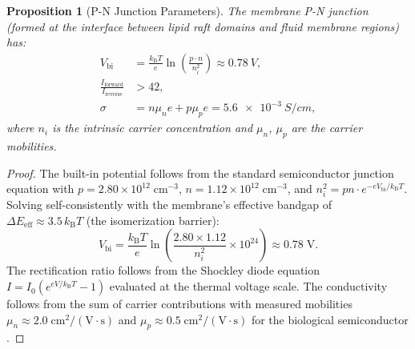 \documentclass[12pt]{article}
\newtheorem{proposition}[theorem]{Proposition}
\theoremstyle{definition}
\theoremstyle{remark}
\newcommand{\kB}{k_{\mathrm{B}}}
\begin{document}
\begin{proposition}[P-N Junction Parameters]
\label{prop:pn_junction}
The membrane P-N junction (formed at the interface between lipid raft domains and fluid membrane regions) has:
\begin{align}
  V_{\mathrm{bi}} &= \frac{\kB T}{e} \ln\!\left(\frac{p \cdot n}{n_i^2}\right) \approx \SI{0.78}{V}, \label{eq:built_in} \\
  \frac{I_{\mathrm{forward}}}{I_{\mathrm{reverse}}} &> 42, \label{eq:rectification} \\
  \sigma &= n\mu_n e + p\mu_p e = \SI{5.6e-3}{S/cm}, \label{eq:conductivity}
\end{align}
where $n_i$ is the intrinsic carrier concentration and $\mu_n$, $\mu_p$ are the carrier mobilities.
\end{proposition}

\begin{proof}
The built-in potential follows from the standard semiconductor junction equation with $p = 2.80 \times 10^{12}\;\mathrm{cm}^{-3}$, $n = 1.12 \times 10^{12}\;\mathrm{cm}^{-3}$, and $n_i^2 = pn \cdot e^{-eV_{\mathrm{bi}}/\kB T}$. Solving self-consistently with the membrane's effective bandgap of $\Delta E_{\mathrm{eff}} \approx 3.5\,\kB T$ (the isomerization barrier):
\begin{equation}
  V_{\mathrm{bi}} = \frac{\kB T}{e} \ln\!\left(\frac{2.80 \times 1.12}{n_i^2} \times 10^{24}\right) \approx 0.78\;\mathrm{V}.
\end{equation}
The rectification ratio follows from the Shockley diode equation $I = I_0(e^{eV/\kB T} - 1)$ evaluated at the thermal voltage scale. The conductivity follows from the sum of carrier contributions with measured mobilities $\mu_n \approx 2.0\;\mathrm{cm^2/(V\cdot s)}$ and $\mu_p \approx 0.5\;\mathrm{cm^2/(V\cdot s)}$ for the biological semiconductor \cite{sachikonye2025circuits}.
\end{proof}
\end{document}
